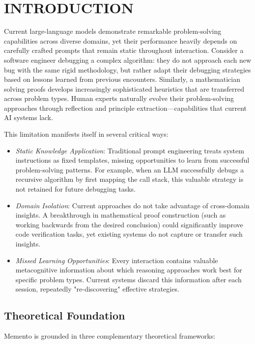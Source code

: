 \documentclass[10pt,a4paper,twocolumn]{article}
\begin{document}
\newpage
\section{INTRODUCTION}


Current large-language models demonstrate remarkable problem-solving capabilities across diverse domains, yet their performance heavily depends on carefully crafted prompts that remain static throughout interaction. Consider a software engineer debugging a complex algorithm: they do not approach each new bug with the same rigid methodology, but rather adapt their debugging strategies based on lessons learned from previous encounters. Similarly, a mathematician solving proofs develops increasingly sophisticated heuristics that are transferred across problem types. Human experts naturally evolve their problem-solving approaches through reflection and principle extraction—capabilities that current AI systems lack.

This limitation manifests itself in several critical ways:


\begin{itemize}
    \item \textit{Static Knowledge Application}: Traditional prompt engineering treats system instructions as fixed templates, missing opportunities to learn from successful problem-solving patterns. For example, when an LLM successfully debugs a recursive algorithm by first mapping the call stack, this valuable strategy is not retained for future debugging tasks.
    \item \textit{Domain Isolation}: Current approaches do not take advantage of cross-domain insights. A breakthrough in mathematical proof construction (such as working backwards from the desired conclusion) could significantly improve code verification tasks, yet existing systems do not capture or transfer such insights.
    \item \textit{Missed Learning Opportunities}: Every interaction contains valuable metacognitive information about which reasoning approaches work best for specific problem types. Current systems discard this information after each session, repeatedly "re-discovering" effective strategies.
\end{itemize}


\subsection{Theoretical Foundation}

Memento is grounded in three complementary theoretical frameworks:
\end{document}
